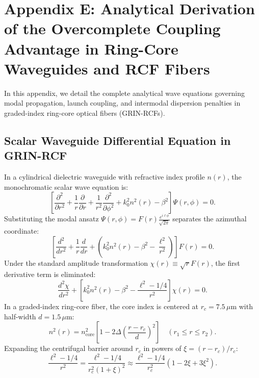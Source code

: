 \documentclass[11pt,a4paper]{article}
\begin{document}
\section{Appendix E: Analytical Derivation of the Overcomplete Coupling Advantage in Ring-Core Waveguides and RCF Fibers}
\label{app:waveguide}

In this appendix, we detail the complete analytical wave equations governing modal propagation, launch coupling, and intermodal dispersion penalties in graded-index ring-core optical fibers (GRIN-RCFs).

\subsection{Scalar Waveguide Differential Equation in GRIN-RCF}

In a cylindrical dielectric waveguide with refractive index profile $n(r)$, the monochromatic scalar wave equation is:
\begin{equation}
\left[ \frac{\partial^2}{\partial r^2} + \frac{1}{r} \frac{\partial}{\partial r} + \frac{1}{r^2} \frac{\partial^2}{\partial \phi^2} + k_0^2 n^2(r) - \beta^2 \right] \Psi(r, \phi) = 0.
\label{eq:app_scalar_helmholtz}
\end{equation}
Substituting the modal ansatz $\Psi(r, \phi) = F(r) \frac{e^{i \ell \phi}}{\sqrt{2\pi}}$ separates the azimuthal coordinate:
\begin{equation}
\left[ \frac{d^2}{dr^2} + \frac{1}{r} \frac{d}{dr} + \left( k_0^2 n^2(r) - \beta^2 - \frac{\ell^2}{r^2} \right) \right] F(r) = 0.
\label{eq:app_radial_ode}
\end{equation}
Under the standard amplitude transformation $\chi(r) \equiv \sqrt{r} F(r)$, the first derivative term is eliminated:
\begin{equation}
\frac{d^2 \chi}{dr^2} + \left[ k_0^2 n^2(r) - \beta^2 - \frac{\ell^2 - 1/4}{r^2} \right] \chi(r) = 0.
\label{eq:app_chi_ode}
\end{equation}
In a graded-index ring-core fiber, the core index is centered at $r_c = 7.5\,\mu\text{m}$ with half-width $d = 1.5\,\mu\text{m}$:
\begin{equation}
n^2(r) = n_{\text{core}}^2 \left[ 1 - 2\Delta \left( \frac{r - r_c}{d} \right)^2 \right] \quad (r_1 \le r \le r_2).
\label{eq:app_n2_core}
\end{equation}
Expanding the centrifugal barrier around $r_c$ in powers of $\xi = (r - r_c) / r_c$:
\begin{equation}
\frac{\ell^2 - 1/4}{r^2} = \frac{\ell^2 - 1/4}{r_c^2 (1 + \xi)^2} \approx \frac{\ell^2 - 1/4}{r_c^2} \left( 1 - 2\xi + 3\xi^2 \right).
\label{eq:app_centrifugal_taylor}
\end{equation}
\end{document}
